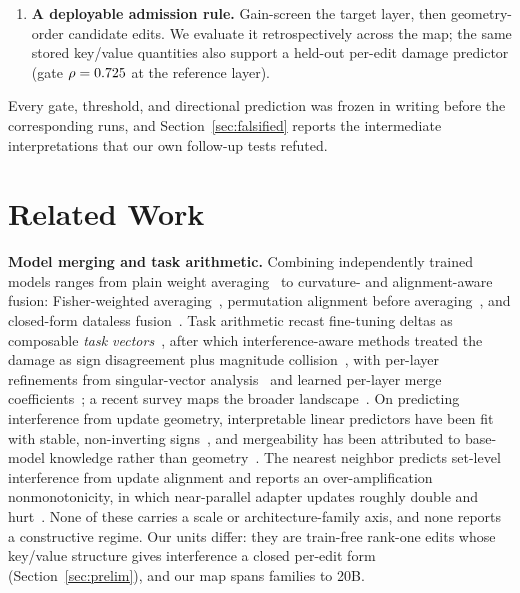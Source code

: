 \documentclass[preprint,12pt]{elsarticle}
\begin{document}
\begin{enumerate}
cross-talk norm is geometry-predicted at $\rho\approx0.99$ in every cell we re-analyzed).
Aligned
cross-talk arrives everywhere; what flips is its effect at the readout: a boost in
low-gain regimes, a penalty in high-gain regimes. As a mechanism we offer an explicit
\emph{conjecture} --- over-amplification past an operating point in high-gain layers,
small-signal linear reinforcement in low-gain layers --- consistent with everything we
measure but not derived from a formal readout model.
\item \textbf{A deployable admission rule.} Gain-screen the target layer, then geometry-order
candidate edits. We evaluate it retrospectively across the map; the same stored key/value
quantities also support a held-out per-edit damage predictor (gate $\rho=0.725{}$
at the reference layer).
\end{enumerate}

Every gate, threshold, and directional prediction was frozen in writing before the
corresponding runs, and Section~\ref{sec:falsified} reports the intermediate
interpretations that our own follow-up tests refuted.

\section{Related Work}\label{sec:related}
\textbf{Model merging and task arithmetic.} Combining independently trained models ranges
from plain weight averaging~\cite{modelsoups2022} to curvature- and alignment-aware fusion:
Fisher-weighted averaging~\cite{fishermerging2022}, permutation alignment before
averaging~\cite{gitrebasin2023}, and closed-form dataless fusion~\cite{regmean2023}. Task
arithmetic recast fine-tuning deltas as composable \emph{task
vectors}~\cite{taskarithmetic2023}, after which interference-aware methods treated the
damage as sign disagreement plus magnitude collision~\cite{ties2023,dare2023}, with per-layer
refinements from singular-vector analysis~\cite{tsv2024} and learned per-layer merge
coefficients~\cite{adamerging2024}; a recent survey maps the broader
landscape~\cite{mergingsurvey2024}. On predicting interference from update geometry,
interpretable linear predictors have been fit with stable, non-inverting
signs~\cite{demystify2026}, and mergeability has been attributed to base-model knowledge
rather than geometry~\cite{willitmerge2026}. The nearest neighbor predicts set-level
interference from update alignment and reports an over-amplification nonmonotonicity, in
which near-parallel adapter updates roughly double and hurt~\cite{mergeprobe2026}. None of
these carries a scale or architecture-family axis, and none reports a constructive regime.
Our units differ: they are train-free rank-one edits whose key/value structure gives
interference a closed per-edit form (Section~\ref{sec:prelim}), and our map spans
\nFamilies{} families to 20B.
\end{document}
